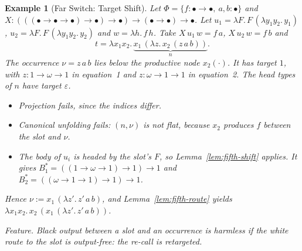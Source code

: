 \documentclass[10pt,a4paper]{article}
\theoremstyle{plain}%
\newtheorem{example}[theorem]{Example}
\begin{document}
\begin{example}[Far Switch: Target Shift]\label{ex:ex-shift}
Let $\Phi = \{f : \bullet\to\bullet,\ a,b : \bullet\}$ and $X : (((\bullet\to\bullet\to\bullet)\to\bullet)\to\bullet) \to (\bullet\to\bullet) \to \bullet$.
Let $u_1 = \lambda F.\,F\,(\lambda y_1y_2.\,y_1)$, $u_2 = \lambda F.\,F\,(\lambda y_1y_2.\,y_2)$ and $w = \lambda h.\,f\,h$.
Take $X\,u_1\,w = f\,a$, $X\,u_2\,w = f\,b$ and
\[
t = \lambda x_1x_2.\,\underbrace{x_1\,(\lambda z.\,x_2\,(z\,a\,b))}_{n}.
\]
The occurrence $\nu = z\,a\,b$ lies below the productive node $x_2(\cdot)$.
It has target $1$, with $z : 1 \to \omega \to 1$ in equation~1 and $z : \omega \to 1 \to 1$ in equation~2.
The head types of $n$ have target $\varepsilon$.
\begin{itemize}
\item Projection fails, since the indices differ.
\item Canonical unfolding fails: $(n,\nu)$ is not flat, because $x_2$ produces $f$ between the slot and $\nu$.
\item The body of $u_i$ is headed by the slot's $F$, so Lemma~\ref{lem:fifth-shift} applies.
It gives $B^*_1 = ((1 \to \omega \to 1) \to 1) \to 1$ and $B^*_2 = ((\omega \to 1 \to 1) \to 1) \to 1$.
\end{itemize}
Hence $\nu := x_1\,(\lambda z'.\,z'\,a\,b)$, and Lemma~\ref{lem:fifth-route} yields $\lambda x_1x_2.\,x_2\,(x_1\,(\lambda z'.\,z'\,a\,b))$.

\emph{Feature.}
Black output between a slot and an occurrence is harmless if the white route to the slot is output-free: the re-call is retargeted.
\end{example}
\end{document}
